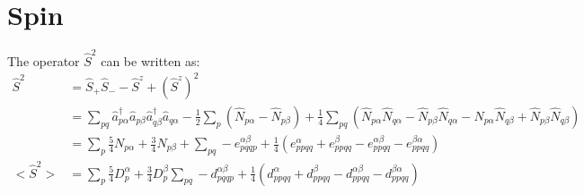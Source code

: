 
\section{Spin}



The operator $\hat{S}^2$ can be written as:
\begin{align}
  \hat{S}^2 &= \hat{S}_+ \hat{S}_- - \hat{S}^z + (\hat{S}^z)^2 \\
  &= \sum_{pq} \hat{a}_{p \alpha}^\dagger \hat{a}_{p \beta}  \hat{a}_{q \beta}^\dagger \hat{a}_{q \alpha}  - \frac{1}{2} \sum_{p}  (\hat{N}_{p \alpha} - \hat{N}_{p \beta}) + \frac{1}{4} \sum_{pq} (\hat{N}_{p \alpha} \hat{N}_{q \alpha}  - \hat{N}_{p \beta} \hat{N}_{q \alpha}  - \hat{N}_{p \alpha} \hat{N}_{q \beta} + \hat{N}_{p \beta}  \hat{N}_{q \beta} ) \\
  &= \sum_{p} \frac{5}{4} N_{p \alpha} + \frac{3}{4} N_{p \beta} + \sum_{pq} - e_{pqqp}^{\alpha \beta} +  \frac{1}{4} (e_{ppqq}^{\alpha} + e_{ppqq}^{\beta} - e_{ppqq}^{\alpha \beta} - e_{ppqq}^{\beta \alpha}) \\
  < \hat{S}^2 > &=  \sum_{p} \frac{5}{4} D^{\alpha}_p  + \frac{3}{4} D^{\beta}_p  \sum_{pq} - d_{pqqp}^{\alpha \beta} +  \frac{1}{4} (d_{ppqq}^{\alpha} + d_{ppqq}^{\beta} - d_{ppqq}^{\alpha \beta} - d_{ppqq}^{\beta \alpha})
\end{align}


